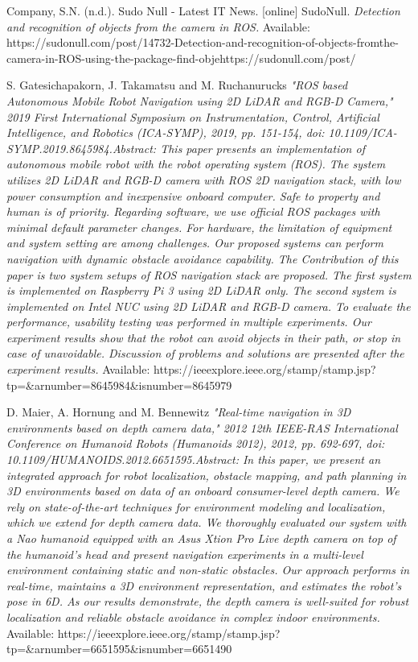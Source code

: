 \documentclass[twoside,12pt,times,onecolumn,a4paper]{report}
\begin{document}
\begin{thebibliography}{9}
Company, S.N. (n.d.). Sudo Null - Latest IT News. [online] SudoNull. 
\textit{Detection and recognition of objects from the camera in ROS.}
Available: https://sudonull.com/post/14732-Detection-and-recognition-of-objects-fromthe-camera-in-ROS-using-the-package-find-objehttps://sudonull.com/post/

S. Gatesichapakorn, J. Takamatsu and M. Ruchanurucks
\textit{"ROS based Autonomous Mobile Robot Navigation using 2D LiDAR and RGB-D Camera," 2019 First International Symposium on Instrumentation, Control, Artificial Intelligence, and Robotics (ICA-SYMP), 2019, pp. 151-154, doi: 10.1109/ICA-SYMP.2019.8645984.Abstract: This paper presents an implementation of autonomous mobile robot with the robot operating system (ROS). The system utilizes 2D LiDAR and RGB-D camera with ROS 2D navigation stack, with low power consumption and inexpensive onboard computer. Safe to property and human is of priority. Regarding software, we use official ROS packages with minimal default parameter changes. For hardware, the limitation of equipment and system setting are among challenges. Our proposed systems can perform navigation with dynamic obstacle avoidance capability. The Contribution of this paper is two system setups of ROS navigation stack are proposed. The first system is implemented on Raspberry Pi 3 using 2D LiDAR only. The second system is implemented on Intel NUC using 2D LiDAR and RGB-D camera. To evaluate the performance, usability testing was performed in multiple experiments. Our experiment results show that the robot can avoid objects in their path, or stop in case of unavoidable. Discussion of problems and solutions are presented after the experiment results. }
Available: https://ieeexplore.ieee.org/stamp/stamp.jsp?tp=\&arnumber=8645984\&isnumber=8645979


D. Maier, A. Hornung and M. Bennewitz
\textit{"Real-time navigation in 3D environments based on depth camera data," 2012 12th IEEE-RAS International Conference on Humanoid Robots (Humanoids 2012), 2012, pp. 692-697, doi: 10.1109/HUMANOIDS.2012.6651595.Abstract: In this paper, we present an integrated approach for robot localization, obstacle mapping, and path planning in 3D environments based on data of an onboard consumer-level depth camera. We rely on state-of-the-art techniques for environment modeling and localization, which we extend for depth camera data. We thoroughly evaluated our system with a Nao humanoid equipped with an Asus Xtion Pro Live depth camera on top of the humanoid's head and present navigation experiments in a multi-level environment containing static and non-static obstacles. Our approach performs in real-time, maintains a 3D environment representation, and estimates the robot's pose in 6D. As our results demonstrate, the depth camera is well-suited for robust localization and reliable obstacle avoidance in complex indoor environments.
}
Available: https://ieeexplore.ieee.org/stamp/stamp.jsp?tp=\&arnumber=6651595\&isnumber=6651490


\end{thebibliography}
\end{document}
